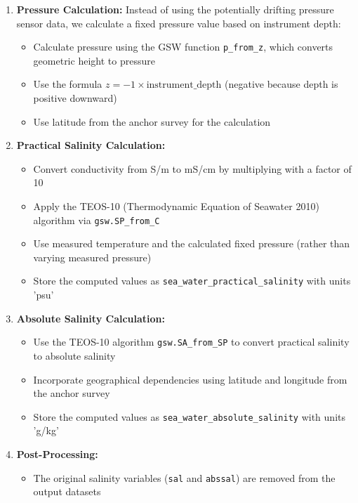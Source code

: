 \begin{enumerate}
    \item \textbf{Pressure Calculation:} Instead of using the potentially drifting pressure sensor data, we calculate a fixed pressure value based on instrument depth:
    \begin{itemize}
        \item Calculate pressure using the GSW function \texttt{p\_from\_z}, which converts geometric height to pressure
        \item Use the formula $z = -1 \times \text{instrument\_depth}$ (negative because depth is positive downward)
        \item Use latitude from the anchor survey for the calculation
    \end{itemize}
    
    \item \textbf{Practical Salinity Calculation:}
    \begin{itemize}
        \item Convert conductivity from S/m to mS/cm by multiplying with a factor of 10
        \item Apply the TEOS-10 (Thermodynamic Equation of Seawater 2010) algorithm via \texttt{gsw.SP\_from\_C}
        \item Use measured temperature and the calculated fixed pressure (rather than varying measured pressure)
        \item Store the computed values as \texttt{sea\_water\_practical\_salinity} with units 'psu'
    \end{itemize}
    
    \item \textbf{Absolute Salinity Calculation:}
    \begin{itemize}
        \item Use the TEOS-10 algorithm \texttt{gsw.SA\_from\_SP} to convert practical salinity to absolute salinity
        \item Incorporate geographical dependencies using latitude and longitude from the anchor survey
        \item Store the computed values as \texttt{sea\_water\_absolute\_salinity} with units 'g/kg'
    \end{itemize}
    
    \item \textbf{Post-Processing:}
    \begin{itemize}
        \item The original salinity variables (\texttt{sal} and \texttt{abssal}) are removed from the output datasets
    \end{itemize}
\end{enumerate}

